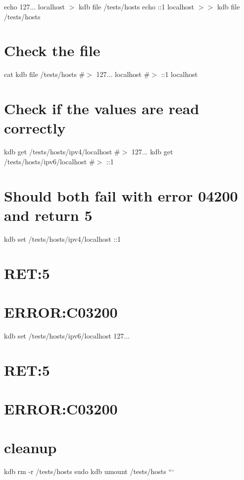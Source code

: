 echo \textquotesingle{}127... localhost\textquotesingle{} $>$ {\ttfamily kdb file /tests/hosts} echo \textquotesingle{}\+:\+:1 localhost\textquotesingle{} $>$$>$ {\ttfamily kdb file /tests/hosts}

\section*{Check the file}

cat {\ttfamily kdb file /tests/hosts} \#$>$ 127... localhost \#$>$ \+:\+:1 localhost

\section*{Check if the values are read correctly}

kdb get /tests/hosts/ipv4/localhost \#$>$ 127... kdb get /tests/hosts/ipv6/localhost \#$>$ \+:\+:1

\section*{Should both fail with error 04200 and return 5}

kdb set /tests/hosts/ipv4/localhost \+:\+:1 \section*{R\+ET\+:5}

\section*{E\+R\+R\+OR\+:C03200}

kdb set /tests/hosts/ipv6/localhost 127... \section*{R\+ET\+:5}

\section*{E\+R\+R\+OR\+:C03200}

\section*{cleanup}

kdb rm -\/r /tests/hosts sudo kdb umount /tests/hosts ``` 